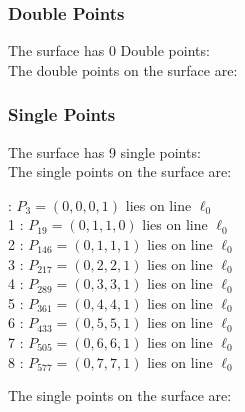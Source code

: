 \documentclass{article}
\begin{document}
{\subsubsection*{Double Points}
The surface has 0 Double points:\\
The double points on the surface are:\\
\begin{multicols}{2}
\noindent
\end{multicols}
\subsubsection*{Single Points}
The surface has 9 single points:\\
The single points on the surface are:\\
\begin{multicols}{2}
 : $P_{3}=( 0, 0, 0, 1 )$ lies on line $\ell_{0}$\\
1 : $P_{19}=( 0, 1, 1, 0 )$ lies on line $\ell_{0}$\\
2 : $P_{146}=( 0, 1, 1, 1 )$ lies on line $\ell_{0}$\\
3 : $P_{217}=( 0, 2, 2, 1 )$ lies on line $\ell_{0}$\\
4 : $P_{289}=( 0, 3, 3, 1 )$ lies on line $\ell_{0}$\\
5 : $P_{361}=( 0, 4, 4, 1 )$ lies on line $\ell_{0}$\\
6 : $P_{433}=( 0, 5, 5, 1 )$ lies on line $\ell_{0}$\\
7 : $P_{505}=( 0, 6, 6, 1 )$ lies on line $\ell_{0}$\\
8 : $P_{577}=( 0, 7, 7, 1 )$ lies on line $\ell_{0}$\\
\end{multicols}
The single points on the surface are:\\
}
\end{document}
